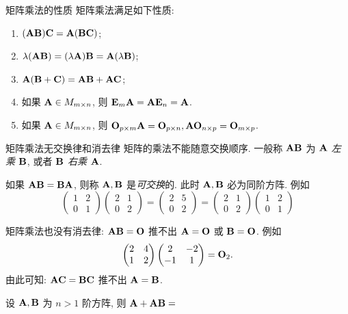 \begin{frame}{矩阵乘法的性质}
	\onslide<+->
	矩阵乘法满足如下性质:
	\begin{enumerate}
		\item $({\mathbf{A}}{\mathbf{B}}){\mathbf{C}}={\mathbf{A}}({\mathbf{B}}{\mathbf{C}})$;
		\item $\lambda({\mathbf{A}}{\mathbf{B}})=(\lambda{\mathbf{A}}){\mathbf{B}}={\mathbf{A}}(\lambda{\mathbf{B}})$;
		\item ${\mathbf{A}}({\mathbf{B}}+{\mathbf{C}})={\mathbf{A}}{\mathbf{B}}+{\mathbf{A}}{\mathbf{C}}$;
		\item 如果 ${\mathbf{A}}\in M_{m\times n}$, 则 ${\mathbf{E}}_m {\mathbf{A}}={\mathbf{A}}{\mathbf{E}}_n={\mathbf{A}}$.
		\item 如果 ${\mathbf{A}}\in M_{m\times n}$, 则 ${\mathbf{O}}_{p\times m} {\mathbf{A}}={\mathbf{O}}_{p\times n}, {\mathbf{A}}{\mathbf{O}}_{n\times p}={\mathbf{O}}_{m\times p}$.
	\end{enumerate}
\end{frame}


\begin{frame}{矩阵乘法无交换律和消去律}
	\onslide<+->
	\alert{矩阵的乘法不能随意交换顺序}.
	\onslide<+->
	一般称 ${\mathbf{A}}{\mathbf{B}}$ 为 \emph{${\mathbf{A}}$ 左乘 ${\mathbf{B}}$}, 或者 \emph{${\mathbf{B}}$ 右乘 ${\mathbf{A}}$}.

	\onslide<+->
	如果 ${\mathbf{A}}{\mathbf{B}}={\mathbf{B}}{\mathbf{A}}$, 则称 ${\mathbf{A}},{\mathbf{B}}$ 是\emph{可交换}的.
	\onslide<+->
	此时 ${\mathbf{A}},{\mathbf{B}}$ \alert{必为同阶方阵}.
	\onslide<+->
	例如
	\[\begin{pmatrix}
		1&2\\0&1
	\end{pmatrix}\begin{pmatrix}
		2&1\\0&2
	\end{pmatrix}=\begin{pmatrix}
		2&5\\0&2
	\end{pmatrix}=\begin{pmatrix}
		2&1\\0&2
	\end{pmatrix}\begin{pmatrix}
		1&2\\0&1
	\end{pmatrix}\]

	\onslide<+->
	矩阵乘法也没有消去律: ${\mathbf{A}}{\mathbf{B}}={\mathbf{O}}$ 推不出 ${\mathbf{A}}={\mathbf{O}}$ 或 ${\mathbf{B}}={\mathbf{O}}$.
	\onslide<+->
	例如
	\[\begin{pmatrix}
		2&4\\1&2
	\end{pmatrix}\begin{pmatrix}
		2&-2\\-1&1
	\end{pmatrix}={\mathbf{O}}_2.\]
	\onslide<+->
	由此可知: ${\mathbf{A}}{\mathbf{C}}={\mathbf{B}}{\mathbf{C}}$ 推不出 ${\mathbf{A}}={\mathbf{B}}$. 

	\onslide<+->
	\begin{exercise}
		设 ${\mathbf{A}},{\mathbf{B}}$ 为 $n>1$ 阶方阵, 则 ${\mathbf{A}}+{\mathbf{A}}{\mathbf{B}}=$
	\end{exercise}
\end{frame}


